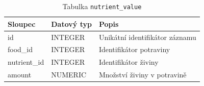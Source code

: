 \begin{table}[ht!]
    \centering
    \begin{tabularx}{\textwidth}{|l|l|L|}
        \hline
        \textbf{Sloupec} & \textbf{Datový typ} & \textbf{Popis}                 \\ \hline
        id               & INTEGER             & Unikátní identifikátor záznamu \\ \hline
        food\_id         & INTEGER             & Identifikátor potraviny        \\ \hline
        nutrient\_id     & INTEGER             & Identifikátor živiny           \\ \hline
        amount           & NUMERIC             & Množství živiny v potravině    \\ \hline
    \end{tabularx}
    \caption{Tabulka \texttt{nutrient\_value}}
    \label{tab:nutrient_value}
\end{table}
